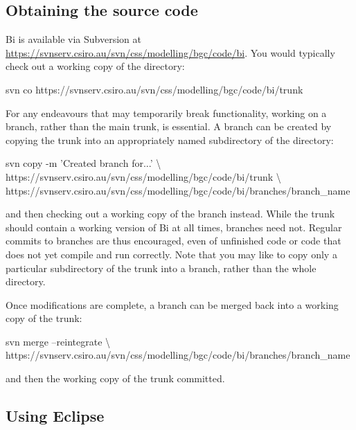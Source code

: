 \subsection{Obtaining the source code}

Bi is available via Subversion at
\href{https://svnserv.csiro.au/svn/css/modelling/bgc/code/bi}{https://svnserv.csiro.au/svn/css/modelling/bgc/code/bi}. You
would typically check out a working copy of the  directory:
\begin{cmdcode}
svn co https://svnserv.csiro.au/svn/css/modelling/bgc/code/bi/trunk
\end{cmdcode}

For any endeavours that may temporarily break functionality, working on a
branch, rather than the main trunk, is essential. A branch can be created by
copying the trunk into an appropriately named subdirectory of the
 directory:
\begin{cmdcode}
svn copy -m 'Created branch for...' \textbackslash
  https://svnserv.csiro.au/svn/css/modelling/bgc/code/bi/trunk \textbackslash
  https://svnserv.csiro.au/svn/css/modelling/bgc/code/bi/branches/branch_name
\end{cmdcode}
and then checking out a working copy of the branch instead. While the trunk
should contain a working version of Bi at all times, branches need
not. Regular commits to branches are thus encouraged, even of unfinished code
or code that does not yet compile and run correctly. Note that you may like to
copy only a particular subdirectory of the trunk into a branch, rather than
the whole directory.

Once modifications are complete, a branch can be merged back into a working
copy of the trunk:
\begin{cmdcode}
svn merge --reintegrate \textbackslash
  https://svnserv.csiro.au/svn/css/modelling/bgc/code/bi/branches/branch_name
\end{cmdcode}
and then the working copy of the trunk committed.

\subsection{Using Eclipse\label{Using_Eclipse}}

